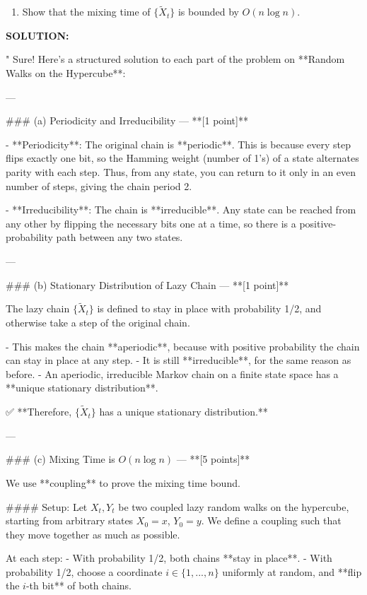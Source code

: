 \begin{enumerate}
\begin{enumerate}
\item {} Show that the mixing time of $\{\tilde{X}_t\}$ is bounded by $O(n \log n)$.
\end{enumerate}

\ifdefined\template
\begin{shaded} \textbf{SOLUTION:}
\ifdefined\sol


"
Sure! Here's a structured solution to each part of the problem on **Random Walks on the Hypercube**:

---

### (a) Periodicity and Irreducibility — **[1 point]**

- **Periodicity**: The original chain is **periodic**. This is because every step flips exactly one bit, so the Hamming weight (number of 1's) of a state alternates parity with each step. Thus, from any state, you can return to it only in an even number of steps, giving the chain period 2.

- **Irreducibility**: The chain is **irreducible**. Any state can be reached from any other by flipping the necessary bits one at a time, so there is a positive-probability path between any two states.

---

### (b) Stationary Distribution of Lazy Chain — **[1 point]**

The lazy chain $\{\tilde{X}_t\}$ is defined to stay in place with probability 1/2, and otherwise take a step of the original chain.

- This makes the chain **aperiodic**, because with positive probability the chain can stay in place at any step.
- It is still **irreducible**, for the same reason as before.
- An aperiodic, irreducible Markov chain on a finite state space has a **unique stationary distribution**.

✅ **Therefore, $\{\tilde{X}_t\}$ has a unique stationary distribution.**

---

### (c) Mixing Time is \( O(n \log n) \) — **[5 points]**

We use **coupling** to prove the mixing time bound.

#### Setup:
Let \( X_t, Y_t \) be two coupled lazy random walks on the hypercube, starting from arbitrary states \( X_0 = x \), \( Y_0 = y \). We define a coupling such that they move together as much as possible.

At each step:
- With probability 1/2, both chains **stay in place**.
- With probability 1/2, choose a coordinate \( i \in \{1, ..., n\} \) uniformly at random, and **flip the \( i \)-th bit** of both chains.


\end{shaded}
\end{enumerate}
